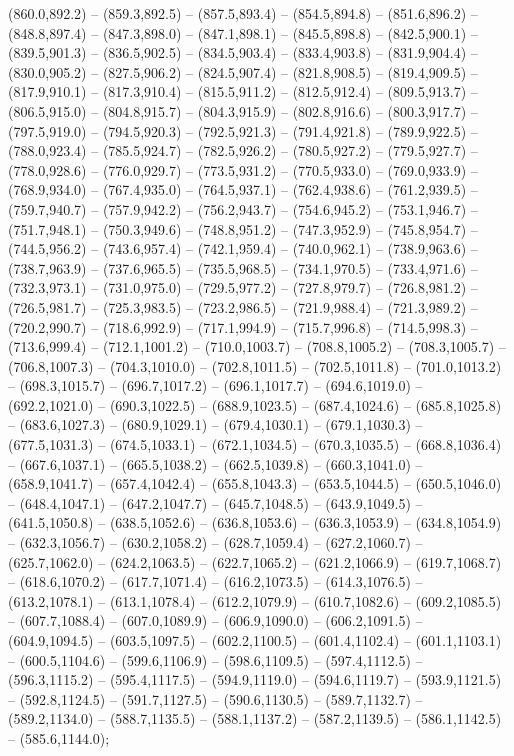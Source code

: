 (860.0,892.2) -- (859.3,892.5) -- (857.5,893.4) -- (854.5,894.8) -- (851.6,896.2) -- (848.8,897.4) -- (847.3,898.0) -- (847.1,898.1) -- (845.5,898.8) -- (842.5,900.1) -- (839.5,901.3) -- (836.5,902.5) -- (834.5,903.4) -- (833.4,903.8) -- (831.9,904.4) -- (830.0,905.2) -- (827.5,906.2) -- (824.5,907.4) -- (821.8,908.5) -- (819.4,909.5) -- (817.9,910.1) -- (817.3,910.4) -- (815.5,911.2) -- (812.5,912.4) -- (809.5,913.7) -- (806.5,915.0) -- (804.8,915.7) -- (804.3,915.9) -- (802.8,916.6) -- (800.3,917.7) -- (797.5,919.0) -- (794.5,920.3) -- (792.5,921.3) -- (791.4,921.8) -- (789.9,922.5) -- (788.0,923.4) -- (785.5,924.7) -- (782.5,926.2) -- (780.5,927.2) -- (779.5,927.7) -- (778.0,928.6) -- (776.0,929.7) -- (773.5,931.2) -- (770.5,933.0) -- (769.0,933.9) -- (768.9,934.0) -- (767.4,935.0) -- (764.5,937.1) -- (762.4,938.6) -- (761.2,939.5) -- (759.7,940.7) -- (757.9,942.2) -- (756.2,943.7) -- (754.6,945.2) -- (753.1,946.7) -- (751.7,948.1) -- (750.3,949.6) -- (748.8,951.2) -- (747.3,952.9) -- (745.8,954.7) -- (744.5,956.2) -- (743.6,957.4) -- (742.1,959.4) -- (740.0,962.1) -- (738.9,963.6) -- (738.7,963.9) -- (737.6,965.5) -- (735.5,968.5) -- (734.1,970.5) -- (733.4,971.6) -- (732.3,973.1) -- (731.0,975.0) -- (729.5,977.2) -- (727.8,979.7) -- (726.8,981.2) -- (726.5,981.7) -- (725.3,983.5) -- (723.2,986.5) -- (721.9,988.4) -- (721.3,989.2) -- (720.2,990.7) -- (718.6,992.9) -- (717.1,994.9) -- (715.7,996.8) -- (714.5,998.3) -- (713.6,999.4) -- (712.1,1001.2) -- (710.0,1003.7) -- (708.8,1005.2) -- (708.3,1005.7) -- (706.8,1007.3) -- (704.3,1010.0) -- (702.8,1011.5) -- (702.5,1011.8) -- (701.0,1013.2) -- (698.3,1015.7) -- (696.7,1017.2) -- (696.1,1017.7) -- (694.6,1019.0) -- (692.2,1021.0) -- (690.3,1022.5) -- (688.9,1023.5) -- (687.4,1024.6) -- (685.8,1025.8) -- (683.6,1027.3) -- (680.9,1029.1) -- (679.4,1030.1) -- (679.1,1030.3) -- (677.5,1031.3) -- (674.5,1033.1) -- (672.1,1034.5) -- (670.3,1035.5) -- (668.8,1036.4) -- (667.6,1037.1) -- (665.5,1038.2) -- (662.5,1039.8) -- (660.3,1041.0) -- (658.9,1041.7) -- (657.4,1042.4) -- (655.8,1043.3) -- (653.5,1044.5) -- (650.5,1046.0) -- (648.4,1047.1) -- (647.2,1047.7) -- (645.7,1048.5) -- (643.9,1049.5) -- (641.5,1050.8) -- (638.5,1052.6) -- (636.8,1053.6) -- (636.3,1053.9) -- (634.8,1054.9) -- (632.3,1056.7) -- (630.2,1058.2) -- (628.7,1059.4) -- (627.2,1060.7) -- (625.7,1062.0) -- (624.2,1063.5) -- (622.7,1065.2) -- (621.2,1066.9) -- (619.7,1068.7) -- (618.6,1070.2) -- (617.7,1071.4) -- (616.2,1073.5) -- (614.3,1076.5) -- (613.2,1078.1) -- (613.1,1078.4) -- (612.2,1079.9) -- (610.7,1082.6) -- (609.2,1085.5) -- (607.7,1088.4) -- (607.0,1089.9) -- (606.9,1090.0) -- (606.2,1091.5) -- (604.9,1094.5) -- (603.5,1097.5) -- (602.2,1100.5) -- (601.4,1102.4) -- (601.1,1103.1) -- (600.5,1104.6) -- (599.6,1106.9) -- (598.6,1109.5) -- (597.4,1112.5) -- (596.3,1115.2) -- (595.4,1117.5) -- (594.9,1119.0) -- (594.6,1119.7) -- (593.9,1121.5) -- (592.8,1124.5) -- (591.7,1127.5) -- (590.6,1130.5) -- (589.7,1132.7) -- (589.2,1134.0) -- (588.7,1135.5) -- (588.1,1137.2) -- (587.2,1139.5) -- (586.1,1142.5) -- (585.6,1144.0);
